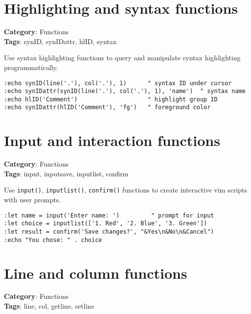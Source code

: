 \section{Highlighting and syntax functions}

\textbf{Category}: Functions\\ \textbf{Tags}: synID, synIDattr, hlID, syntax
\vspace{0.5cm}

Use syntax highlighting functions to query and manipulate syntax highlighting programmatically.

\begin{Exa*}{}
\begin{Verbatim}[fontsize=\footnotesize, breaklines, breakanywhere]
:echo synID(line('.'), col('.'), 1)      " syntax ID under cursor
:echo synIDattr(synID(line('.'), col('.'), 1), 'name')  " syntax name
:echo hlID('Comment')                    " highlight group ID
:echo synIDattr(hlID('Comment'), 'fg')   " foreground color
\end{Verbatim}
\end{Exa*}

\section{Input and interaction functions}

\textbf{Category}: Functions\\ \textbf{Tags}: input, inputsave, inputlist, confirm
\vspace{0.5cm}

Use {\footnotesize \Verb§input()§}, {\footnotesize \Verb§inputlist()§}, {\footnotesize \Verb§confirm()§} functions to create interactive vim scripts with user prompts.

\begin{Exa*}{}
\begin{Verbatim}[fontsize=\footnotesize, breaklines, breakanywhere]
:let name = input('Enter name: ')         " prompt for input
:let choice = inputlist(['1. Red', '2. Blue', '3. Green'])
:let result = confirm('Save changes?', "&Yes\n&No\n&Cancel")
:echo "You chose: " . choice
\end{Verbatim}
\end{Exa*}

\section{Line and column functions}

\textbf{Category}: Functions\\ \textbf{Tags}: line, col, getline, setline
\vspace{0.5cm}

